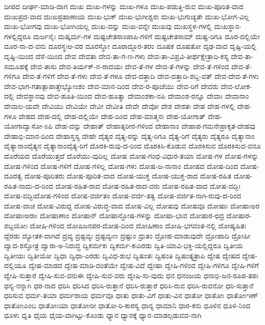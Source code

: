 {ದೀಪದ
ದೀರ್ಘ-ಮಾಡಿ-ದಾಗ
ದುಃಖ
ದುಃಖ-ಗಳನ್ನು
ದುಃಖ-ಗಳೂ
ದುಃಖ-ಪಡುತ್ತಿ-ರುವ
ದುಃಖ-ಪೂರಿತ-ವಾದ
ದುಃಖಪ್ರದ-ವಾದ
ದುಃಖಪ್ರಹಾಣಾಯ
ದುಃಖ-ಭುಕ್
ದುಃಖ-ಭುಗೀಶ್ವರಃ
ದುಃಖ-ಭುಗುಚ್ಯತೇ
ದುಃಖ-ಭೋಗ-ವಿಲ್ಲ
ದುಃಖ-ಭೋಗವು
ದುಃಖ-ಭೋಗಿಯಲ್ಲ
ದುಃಖ-ವನ್ನು
ದುಃಖ-ವನ್ನೇ
ದುಃಖವು
ದುಃಖಸ್ಥಳ-ಗಳಲ್ಲಿ
ದುಃಖಸ್ಥಾನ-ಗಳಲ್ಲಿದ್ದರೂ
ದುರ್ಜನೈಃ
ದುಷ್ಕರ್ಮ-ಗಳ
ದುಷ್ಟಚೇತಸಾಂಪಾಪಿ-ಗಳಿಗೆ
ದುಷ್ಟಚೇತಸಾಮ್
ದುಷ್ಟ-ರಿಗೂ
ದೂರ-ದಲ್ಲಿಯೇ
ದೂರ-ನಾ-ದ-ವನು
ದೂರಸ್ಥಃಅ-ವರ
ದೂರಸ್ಥೋ
ದೂರಾದ್ದೂರ-ತರಂ
ದೂಷಕ
ದೂಷತೋ
ದೃಢ-ವಾದ
ದೃಷ್ಟಿ-ಯಲ್ಲಿ
ದೃಷ್ಟಿ-ಯಿಂದ
ದೆಸೆ-ಯಿಂದ
ದೇವ
ದೇವತಾ
ದೇವ-ತಾ-ಗ-ಣ-ಗಳು
ದೇವ-ತಾ-ವಿಪ್ರವಿ-ತೀರ್ಥಕ್ಷೇತ್ರಾದಿ-ಕಸ್ಯ
ದೇವ-ತಾ-ಸಮೂಹಕ್ಕೆ
ದೇವ-ತಾಸು
ದೇವ-ತಿರ್ಯಕ್-ನ-ರಾದಯಃ
ದೇವ-ತೆ-ಗಳ
ದೇವ-ತೆ-ಗಳನ್ನು
ದೇವ-ತೆ-ಗಳಿಂದ
ದೇವ-ತೆ-ಗಳಿಗೂ
ದೇವ-ತೆ-ಗಳಿಗೆ
ದೇವ-ತೆ-ಗಳು
ದೇವ-ತೆ-ಗಳೂ
ದೇವ-ದತ್ತಾದಿ
ದೇವ-ದತ್ತಾದಿ-ಶಬ್ದ-ವತ್
ದೇವ-ದೇವ-ತೆ-ಗಳು
ದೇವ-ಭಾಗ-ಗತಾತ್ಪಾಪಾತ್ತೇಭ್ಯೋಂಶಂ
ದೇವ-ಮಾನ-ದಿಂದ
ದೇವ-ರ-ಪೂಜೆಯು
ದೇವ-ರಿಗೆ
ದೇವರು
ದೇವ-ಲೋಕ-ದಲ್ಲಿ
ದೇವಸ್ಥಾನವು
ದೇವ-ಹೂತಿ-ಯಿಂದ
ದೇವ-ಹೂತ್ಯಾ
ದೇವಾಂಶಕಾ-ನಪಿ
ದೇವಾಂಶ-ರನ್ನೂ
ದೇವಾಃ
ದೇವಾನಾಂ
ದೇವಾಲ-ಯವೇ
ದೇವಿಯು
ದೇವಿಯೇ
ದೇವೀ
ದೇವೀತಿ
ದೇವೇ
ದೇವೋ
ದೇಶ
ದೇಶತಃ
ದೇಹ
ದೇಹ-ಗಳಲ್ಲಿ
ದೇಹ-ಗಳೂ
ದೇಹದ
ದೇಹ-ದಲ್ಲಿ
ದೇಹ-ದಲ್ಲಿಯೇ
ದೇಹ-ದಿಂದ
ದೇಹ-ಮಾತ್ಮನಃ
ದೇಹ-ಯೋಗಾತ್
ದೇಹ-ಯೋಗಾದ್ವಾಸೋ-ಽಪಿ
ದೇಹ-ವನ್ನು
ದೇಹಾತ್
ದೇಹಾತ್ಶರೀರ-ಗಳಿಂದ
ದೇಹಾನಾಂ
ದೇಹಾಪ-ಗಮನೇಪ್ರಾಕೃತ-ದೇಹವು
ದೇಹಾಭಿ-ಮಾನ-ದಿಂದ
ದೇಹಾಸ್ತಸ್ಯ
ದೇಹೇ
ದೈತ್ಯರ
ದೈತ್ಯ-ರನ್ನು
ದೈತ್ಯ-ರಿಗೂ
ದೈತ್ಯ-ರಿಗೆ
ದೈತ್ಯರು
ದೈತ್ಯರೂ
ದೈತ್ಯಾನಾಂ
ದೈತ್ಯಾನಾಂದೈತ್ಯನ
ದೈತ್ಯಾನಾಂದೈತ್ಯ-ರಿಗೆ
ದೊರಕಿ-ರುವು-ದ-ರಿಂದ
ದೊರಕಿಸಿ-ಕೊಡುವ
ದೊರಕಿಸುವ
ದೊರಕಿಸುವ-ವನೂ
ದೊರೆಯದ
ದೊರೆಯುತ್ತದೆ
ದೊರೆಯು-ವುದಿಲ್ಲ
ದೋಷ
ದೋಷ-ಗಂಧ-ವಿಧುರ-ತಯಾ
ದೋಷ-ಗಳ
ದೋಷ-ಗಳನ್ನು
ದೋಷ-ಗಳಿಂದ
ದೋಷ-ಗಳಿಗೆ
ದೋಷ-ಗಳಿಲ್ಲ
ದೋಷ-ಗಳು
ದೋಷ-ಜ-ನಾನಾಂ
ದೋಷದ
ದೋಷ-ದಿಂದ
ದೋಷ-ದೂರತ್ವ
ದೋಷ-ಪೂರಿತರು
ದೋಷ-ಪೂರಿತ-ವಾದ
ದೋಷ-ಯುಕ್ತ
ದೋಷ-ಯುಕ್ತ-ರಾದ
ದೋಷ-ರಹಿತ
ದೋಷ-ರಹಿತ-ನಾದು-ದ-ರಿಂದ
ದೋಷ-ರಹಿತ-ರಾದ
ದೋಷ-ರಹಿತ-ರಾದ-ವರು
ದೋಷ-ರಹಿತ-ವಾದ
ದೋಷ-ವದ್ಭಿಃ
ದೋಷ-ವದ್ಭಿಃದೋಷ-ಗಳಿಂದ
ದೋಷ-ವರ್ಜಿತಂ
ದೋಷ-ವರ್ಜಿ-ತತ್ವ
ದೋಷ-ವರ್ಜಿತ-ನಾಗಿ-ರುವು-ದ-ರಿಂದ
ದೋಷ-ವಾಚ
ದೋಷ-ವಿರುದ್ದ
ದೋಷ-ವಿರುದ್ಧ-ವಾದ
ದೋಷ-ವಿಲ್ಲ
ದೋಷವು
ದೋಷವೂ
ದೋಷಾಃ
ದೋಷಾಃಅರ
ದೋಷಾಃಅರಾಃ
ದೋಷಾಣಾಂ
ದೋಷಾನ್
ದೋಷಾನ್ದೋಷ-ಗಳನ್ನು
ದೋಷಾ-ಭಾವ
ದೋಷಾರ-ಛಿದ್ರ
ದೋಷಾರ-ಶಬ್ದಯೋಃ
ದೋಷಿ-ಗಳಿಂದ
ದೋಷಿಜನಪರ-ದೋಷ-ದಿಂದ
ದೋಷಿಣಾಂ
ದೋಷಿ-ಭಗವಂತ-ನಲ್ಲಿ
ದೋಷ್ಯಹಿತಃ
ದ್ದೆರಡು
ದ್ಯೋತಕ-ವಾಗಿದೆ
ದ್ರವ್ಯ
ದ್ರಷ್ಟವ್ಯಃ
ದ್ರಷ್ಟವ್ಯಃಣ
ದ್ರಷ್ಟುಂ
ದ್ರುತಂ
ದ್ರೋಹ-ಮಾಡುವುದೇ
ದ್ರೋಹಾದಿ
ದ್ರೋಹೀ
ದ್ವಾದ-ಶಸ್ತೋತ್ರ
ದ್ವಾರಾ-ಅ-ನಿರುದ್ಧ
ದ್ವಿಕರ್ಮಕಃ
ದ್ವಿಕರ್ಮ-ಕಃಎರಡು
ದ್ವಿತಿ-ಯಾವಿ-ಭಕ್ತಿ-ಯಲ್ಲಿದ್ದರೂ
ದ್ವಿತೀಯ
ದ್ವಿತೀಯಃ
ದ್ವಿತೀಯೋ
ದ್ವಿಧಾ
ದ್ವಿಧಾ-ಎರಡು
ದ್ವಿವಿಧ-ಶುಭ
ದ್ವಿಷಂತಃ
ದ್ವಿಷಂತಿ
ದ್ವಿಷಂತ್ಯತ್ರಾಪಿ
ದ್ವೇಷ
ದ್ವೇಷದ
ದ್ವೇಷ-ದಲ್ಲಿಯೂ
ದ್ವೇಷ-ಮಾಡದ
ದ್ವೇಷ-ಮಾಡಿ-ದಂತೆಯೇ
ದ್ವೇಷ-ವಿದೆ
ದ್ವೇಷಾ
ದ್ವೇಷಿ-ಗಳಿಂದ
ದ್ವೇಷಿ-ಗಳಿಗೂ
ದ್ವೇಷಿ-ಗಳಿಗೆ
ದ್ವೇಷಿ-ಸುತ್ತಾರೆ
ದ್ವೇಷಿ-ಸುವ-ವನುಈ
ದ್ವೇಷಿ-ಸುವ-ವರು
ದ್ವೇಷಿ-ಸು-ವುದು
ಧನ
ಧನಂಜಯ
ಧನಾಭಿ-ಜನ-ರೂಪ-ತಪಃ
ಧನ್ಯ-ನನ್ನಾಗಿ
ಧರ-ನಾದ
ಧರಿಸಿ
ಧರಿಸಿದ
ಧರಿಸಿ-ರುತ್ತಾನೆ
ಧರಿಸಿ-ರುತ್ತಾರೆ
ಧರಿಸಿ-ರುವ
ಧರಿಸಿ-ರುವನೋ
ಧರಿ-ಸುತ್ತಾನೆ
ಧರಿಸುವ
ಧರ್ಮ-ತಯಾ
ಧರ್ಮರಾಯ
ಧರ್ಮವೂ
ಧಾತು
ಧಾತು-ವಿಗೆ
ಧಾತು-ವಿನ
ಧಾತೋ
ಧಾತೋಃ
ಧಾತೋಃಇಣ್
ಧಾತೋಃಎಂಬ
ಧಾತೋಃಯಾ
ಧಾತೋಃರೀ
ಧಾತೋ-ರಿ-ಕಾರಸ್ಯ
ಧಾನ್ಯ
ಧಾಮಾನಿ
ಧಾರ-ಕನು
ಧೂಳಿನ
ಧೂಳಿ-ನಿಂದ
ಧೂಳು
ಧೃತಿ
ಧೈಯ
ಧೈಯ-ವಾಗಿಟ್ಟು-ಕೊಂಡು
ಧ್ಯಾನ
ಧ್ಯಾನಕ್ಕೆ
ಧ್ಯಾನ-ಮಾಡಲ್ಪಡುವವ-ನಾಗಿ
}
